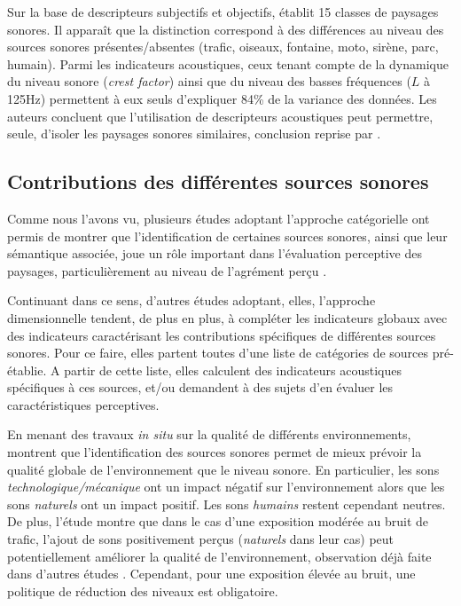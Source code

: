 Sur la base de descripteurs subjectifs et objectifs, \citep{torija2013application} établit 15 classes de paysages sonores. Il apparaît que la distinction correspond à des différences au niveau des sources sonores présentes/absentes (trafic, oiseaux, fontaine, moto, sirène, parc, humain). Parmi les indicateurs acoustiques, ceux tenant compte de la dynamique du niveau sonore (\emph{crest factor}) ainsi que du niveau des basses fréquences ($L$ à 125Hz) permettent à eux seuls d'expliquer 84\% de la variance des données. Les auteurs concluent que l'utilisation de descripteurs acoustiques peut permettre, seule, d'isoler les paysages sonores similaires, conclusion reprise par \citep{rychtarikova2013soundscape}.

\subsection{Contributions des différentes sources sonores}
\label{sec:ch3_contribSource}

Comme nous l'avons vu, plusieurs études adoptant l'approche catégorielle ont permis de montrer que l'identification de certaines sources sonores, ainsi que leur sémantique associée, joue un rôle important dans l'évaluation perceptive des paysages, particulièrement au niveau de l'agrément perçu \citep{defreville2004aactivity,guastavino2006ideal,nilsson2007soundscape,szeremeta2009analysis,gozalo2015relationship}.

Continuant dans ce sens, d'autres études adoptant, elles, l'approche dimensionnelle tendent, de plus en plus, à compléter les indicateurs globaux avec des indicateurs caractérisant les contributions spécifiques de différentes sources sonores. Pour ce faire, elles partent toutes d'une liste de catégories de sources pré-établie. A partir de cette liste, elles calculent des indicateurs acoustiques spécifiques à ces sources, et/ou demandent à des sujets d'en évaluer les caractéristiques perceptives.

En menant des travaux \emph{in situ} sur la qualité de différents environnements, \citep{nilsson2007acoustic,nilsson2007soundscape} montrent que l'identification des sources sonores permet de mieux prévoir la qualité globale de l'environnement que le niveau sonore. En particulier, les sons \emph{technologique/mécanique} ont un impact négatif sur l'environnement alors que les sons \emph{naturels} ont un impact positif. Les sons \emph{humains} restent cependant neutres. De plus, l'étude montre que dans le cas d'une exposition modérée au bruit de trafic, l'ajout de sons positivement perçus (\emph{naturels} dans leur cas) peut potentiellement améliorer la qualité de l'environnement, observation déjà faite dans d'autres études \citep{hong2013designing,galbrun2012perceptual}. Cependant, pour une exposition élevée au bruit, une politique de réduction des niveaux est obligatoire.


